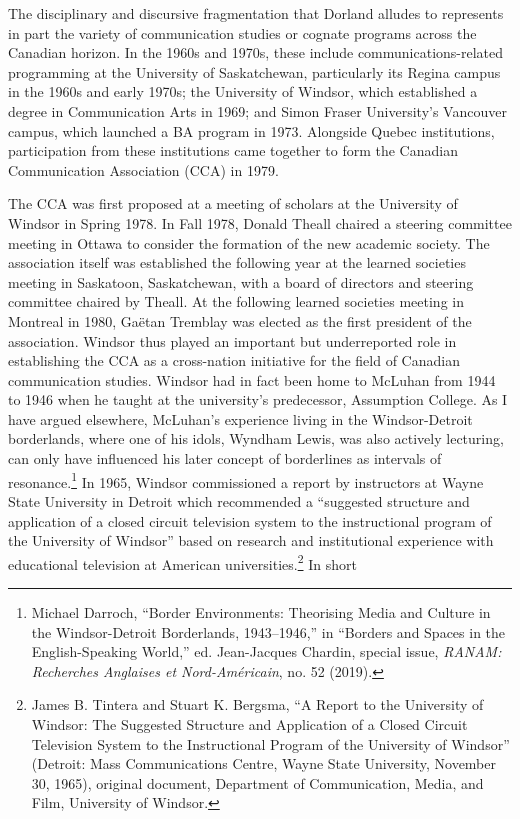 \documentclass{tufte-handout}
\begin{document}
\noindent The disciplinary and discursive fragmentation that Dorland alludes to
represents in part the variety of communication studies or cognate
programs across the Canadian horizon. In the 1960s and 1970s, these
include communications-related programming at the University of
Saskatchewan, particularly its Regina campus in the 1960s and early
1970s; the University of Windsor, which established a degree in
Communication Arts in 1969; and Simon Fraser University's Vancouver
campus, which launched a BA program in 1973. Alongside Quebec
institutions, participation from these institutions came together to
form the Canadian Communication Association (CCA) in 1979.

The CCA was first proposed at a meeting of scholars at the University of
Windsor in Spring 1978. In Fall 1978, Donald Theall chaired a steering
committee meeting in Ottawa to consider the formation of the new
academic society. The association itself was established the following
year at the learned societies meeting in Saskatoon, Saskatchewan, with a
board of directors and steering committee chaired by Theall. At the
following learned societies meeting in Montreal in 1980, Gaëtan Tremblay
was elected as the first president of the association. Windsor thus
played an important but underreported role in establishing the CCA as a
cross-nation initiative for the field of Canadian communication studies.
Windsor had in fact been home to McLuhan from 1944 to 1946 when he
taught at the university's predecessor, Assumption College. As I have
argued elsewhere, McLuhan's experience living in the Windsor-Detroit
borderlands, where one of his idols, Wyndham Lewis, was also actively
lecturing, can only have influenced his later concept of borderlines as
intervals of resonance.\footnote{Michael Darroch, ``Border Environments:
  Theorising Media and Culture in the Windsor-Detroit Borderlands,
  1943--1946,'' in ``Borders and Spaces in the English-Speaking World,''
  ed. Jean-Jacques Chardin, special issue, \emph{RANAM: Recherches
  Anglaises et Nord-Américain}, no. 52 (2019).} In 1965, Windsor
commissioned a report by instructors at Wayne State University in
Detroit which recommended a ``suggested structure and application of a
closed circuit television system to the instructional program of the
University of Windsor'' based on research and institutional experience
with educational television at American universities.\footnote{James B.
  Tintera and Stuart K. Bergsma, ``A Report to the University of
  Windsor: The Suggested Structure and Application of a Closed Circuit
  Television System to the Instructional Program of the University of
  Windsor'' (Detroit: Mass Communications Centre, Wayne State
  University, November 30, 1965), original document, Department of
  Communication, Media, and Film, University of Windsor.} In short
\end{document}
